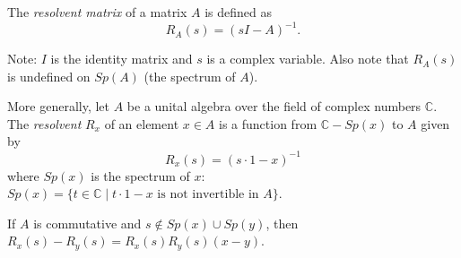 \documentclass[12pt]{article}
\begin{document}
The \emph{resolvent matrix} of a matrix $A$ is defined as
\[
R_{A}(s)=(sI-A)^{-1}.
\]

Note: $I$ is the identity matrix and $s$ is a complex variable. Also note that $R_{A}(s)$ is undefined on $Sp(A)$ (the spectrum of $A$).

More generally, let $A$ be a unital algebra over the field of complex numbers $\mathbb{C}$.  The \emph{resolvent} $R_x$ of an element $x\in A$ is a function from $\mathbb{C}-Sp(x)$ to $A$ given by
\[
R_x(s)=(s\cdot 1-x)^{-1}
\]
where $Sp(x)$ is the spectrum of $x$: $Sp(x)=\lbrace t\in \mathbb{C}\mid t\cdot 1 -x\mbox{ is not invertible in }A\rbrace$.

If $A$ is commutative and $s\notin Sp(x)\cup Sp(y)$, then $R_x(s)-R_y(s)=R_x(s)R_y(s)(x-y)$.
\end{document}
